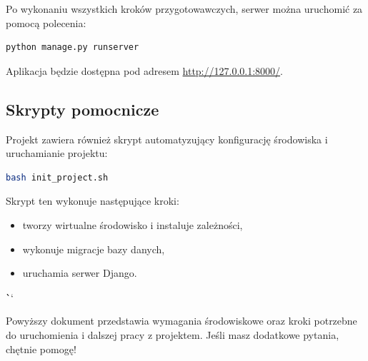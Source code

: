 \documentclass[12pt,a4paper,oneside]{article}
\theoremstyle{definition}
\numberwithin{equation}{section}
\begin{document}
Po wykonaniu wszystkich kroków przygotowawczych, serwer można uruchomić za pomocą polecenia:
\begin{lstlisting}[language=bash]
python manage.py runserver
\end{lstlisting}
Aplikacja będzie dostępna pod adresem \url{http://127.0.0.1:8000/}.

\subsection{Skrypty pomocnicze}

Projekt zawiera również skrypt automatyzujący konfigurację środowiska i uruchamianie projektu:
\begin{lstlisting}[language=bash]
bash init_project.sh
\end{lstlisting}
Skrypt ten wykonuje następujące kroki:
\begin{itemize}
    \item tworzy wirtualne środowisko i instaluje zależności,
    \item wykonuje migracje bazy danych,
    \item uruchamia serwer Django.
\end{itemize}
\```

Powyższy dokument przedstawia wymagania środowiskowe oraz kroki potrzebne do uruchomienia i dalszej pracy z projektem. Jeśli masz dodatkowe pytania, chętnie pomogę!

\newpage
{}
\lstlistoflistings
\renewcommand\refname{Literatura (jeżeli wymagana)}

%
%
%
\end{document}

